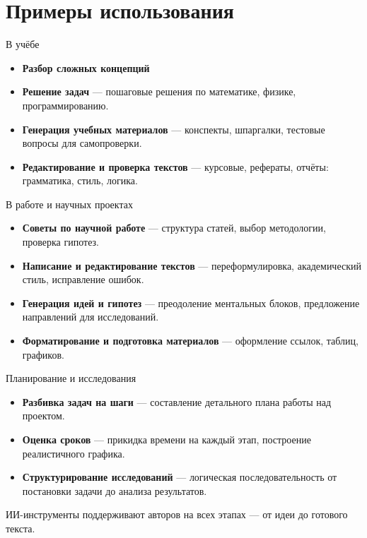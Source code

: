\documentclass[aspectratio=169,10pt,russian]{beamer}
\begin{document}
\section{Примеры использования}

\begin{frame}{В учёбе}
  \begin{itemize}
    \item \textbf{Разбор сложных концепций}
    \item \textbf{Решение задач} — пошаговые решения по математике, физике, программированию.
    \item \textbf{Генерация учебных материалов} — конспекты, шпаргалки, тестовые вопросы для самопроверки.
    \item \textbf{Редактирование и проверка текстов} — курсовые, рефераты, отчёты: грамматика, стиль, логика.
  \end{itemize}
\end{frame}

\begin{frame}{В работе и научных проектах}
  \begin{itemize}
    \item \textbf{Советы по научной работе} — структура статей, выбор методологии, проверка гипотез.
    \item \textbf{Написание и редактирование текстов} — переформулировка, академический стиль, исправление ошибок.
    \item \textbf{Генерация идей и гипотез} — преодоление ментальных блоков, предложение направлений для исследований.
    \item \textbf{Форматирование и подготовка материалов} — оформление ссылок, таблиц, графиков.
  \end{itemize}
\end{frame}

\begin{frame}{Планирование и исследования}
  \begin{itemize}
    \item \textbf{Разбивка задач на шаги} — составление детального плана работы над проектом.
    \item \textbf{Оценка сроков} — прикидка времени на каждый этап, построение реалистичного графика.
    \item \textbf{Структурирование исследований} — логическая последовательность от постановки задачи до анализа результатов.
  \end{itemize}
  \vspace{0.5em}
  \small
  ИИ-инструменты поддерживают авторов на всех этапах — от идеи до готового текста.
\end{frame}
\end{document}
